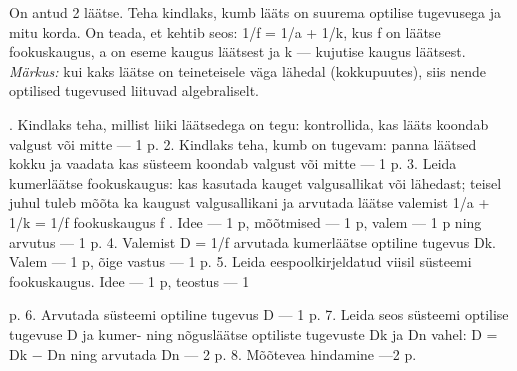 
On antud 2 läätse. Teha kindlaks, kumb lääts on suurema optilise tugevusega ja mitu korda. On teada, et kehtib seos: 1/f = 1/a + 1/k, kus f on läätse fookuskaugus, a on eseme kaugus läätsest ja k --- kujutise kaugus läätsest.
\textit{Märkus:} kui kaks läätse on teineteisele väga lähedal (kokkupuutes), siis nende optilised tugevused liituvad algebraliselt.

\hint

. Kindlaks teha, millist liiki läätsedega on tegu: kontrollida, kas lääts koondab valgust või mitte --- 1 p. 2. Kindlaks teha, kumb on tugevam: panna läätsed kokku ja vaadata kas süsteem koondab valgust või mitte --- 1 p. 3. Leida kumerläätse fookuskaugus: kas kasutada kauget valgusallikat või lähedast; teisel juhul tuleb mõõta ka kaugust valgusallikani ja arvutada läätse valemist 1/a + 1/k = 1/f fookuskaugus f . Idee --- 1 p, mõõtmised --- 1 p, valem --- 1 p ning arvutus --- 1 p. 4. Valemist D = 1/f arvutada kumerläätse optiline tugevus Dk. Valem --- 1 p, õige vastus --- 1 p. 5. Leida eespoolkirjeldatud viisil süsteemi fookuskaugus. Idee --- 1 p, teostus --- 1

p. 6. Arvutada süsteemi optiline tugevus D --- 1 p. 7. Leida seos süsteemi optilise tugevuse D ja kumer- ning nõgusläätse optiliste tugevuste Dk ja Dn vahel: D = Dk $-$ Dn ning arvutada Dn --- 2 p. 8. Mõõtevea hindamine ---2 p.
\probend
